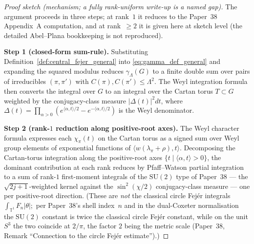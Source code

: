 \documentclass[11pt,a4paper]{article}
\theoremstyle{plain}
\theoremstyle{definition}
\newcommand{\Lammax}{\Lambda}
\newcommand{\T}{\mathbb{T}}
\newcommand{\SU}{\mathrm{SU}}
\newcommand{\Cas}{C}
\begin{document}
\begin{proof}[Proof sketch (mechanism; a fully rank-uniform
write-up is a named gap)]
The argument proceeds in three steps; at rank~$1$ it reduces to the
Paper~38 Appendix~A computation, and at rank~$\ge 2$ it is
given here at sketch level (the detailed Abel--Plana bookkeeping is
not reproduced).

\textbf{Step 1 (closed-form sum-rule).} Substituting
Definition~\ref{def:central_fejer_general} into
\eqref{eq:gamma_def_general} and expanding the squared modulus reduces
$\gamma_\Lammax(G)$ to a finite double sum over pairs of irreducibles
$(\pi, \pi')$ with $\Cas(\pi), \Cas(\pi') \le \Lammax^2$. The Weyl
integration formula then converts the integral over $G$ to an integral
over the Cartan torus $T \subset G$ weighted by the conjugacy-class
measure $|\Delta(t)|^2 dt$, where $\Delta(t) =
\prod_{\alpha > 0}(e^{\langle\alpha, t\rangle/2}
- e^{-\langle\alpha, t\rangle/2})$ is the Weyl denominator.

\textbf{Step 2 (rank-$1$ reduction along positive-root axes).} The
Weyl character formula expresses each $\chi_\pi(t)$ on the Cartan
torus as a signed sum over Weyl group elements of exponential functions
of $\langle w(\lambda_\pi + \rho), t\rangle$. Decomposing the
Cartan-torus integration along the positive-root axes
$\{t \mid \langle\alpha, t\rangle > 0\}$, the dominant contribution at
each rank reduces by Pfaff--Watson partial integration to a sum of
rank-$1$ first-moment integrals of the $\SU(2)$ type of Paper~38 ---
the $\sqrt{2j+1}$-weighted kernel against the $\sin^2(\chi/2)$
conjugacy-class measure --- one per positive-root direction. (These
are \emph{not} the classical circle Fej\'er integrals
$\int_{\T^1}F_n|\theta|$;\ per Paper~38's shell index~$n$ and in the dual-Coxeter normalisation the $\SU(2)$ constant is twice the
classical circle Fej\'er constant, while on the unit $S^3$ the two
coincide at $2/\pi$, the factor $2$ being the metric scale (Paper~38, Remark
``Connection to the circle Fej\'er estimate'').)


\end{proof}
\end{document}
